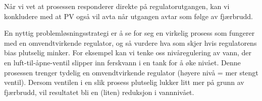 Når vi vet at prosessen responderer direkte på regulatorutgangen, kan vi konkludere med at PV også vil avta når utgangen avtar som følge av fjærbrudd.

En nyttig problemløsningsstrategi er å se for seg en virkelig prosess som fungerer med en omvendtvirkende regulator, og så vurdere hva som skjer hvis regulatorens bias plutselig minker. For eksempel kan vi tenke oss nivåregulering av vann, der en luft-til-åpne-ventil slipper inn ferskvann i en tank for å øke nivået. Denne prosessen trenger tydelig en omvendtvirkende regulator (høyere nivå = mer stengt ventil). Dersom ventilen i en slik prosess plutselig lukker litt mer på grunn av fjærbrudd, vil resultatet bli en (liten) reduksjon i vannnivået.



